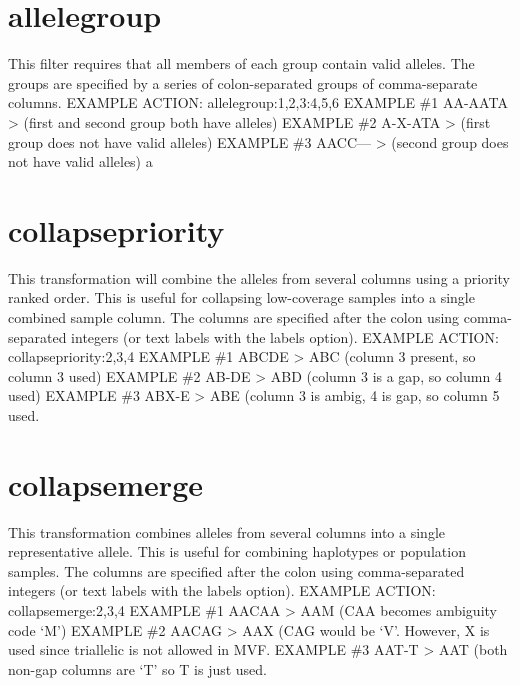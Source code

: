 \documentclass[letterpaper,11pt,english]{sphinxmanual}
\begin{document}
\section{allelegroup}
\label{\detokenize{mvf_filter_modules:allelegroup}}
This filter requires that all members of each group contain
valid alleles.  The groups are specified by a series of colon-separated
groups of comma-separate columns.
EXAMPLE ACTION: allelegroup:1,2,3:4,5,6
EXAMPLE \#1 AA-AATA \textendash{}\textgreater{}  (first and second group both have alleles)
EXAMPLE \#2 A-X-ATA \textendash{}\textgreater{}  (first group does not have valid alleles)
EXAMPLE \#3 AACC— \textendash{}\textgreater{}  (second group does not have valid alleles)
a


\section{collapsepriority}
\label{\detokenize{mvf_filter_modules:collapsepriority}}
This transformation will combine the alleles from several
columns using a priority ranked order. This is useful for collapsing
low-coverage samples into a single combined sample column.
The columns  are specified after the colon using comma-separated integers
(or text labels with the \textendash{}labels option).
EXAMPLE ACTION: collapsepriority:2,3,4
EXAMPLE \#1 ABCDE \textendash{}\textgreater{} ABC   (column 3 present, so column 3 used)
EXAMPLE \#2 AB-DE \textendash{}\textgreater{} ABD   (column 3 is a gap, so column 4 used)
EXAMPLE \#3 ABX-E \textendash{}\textgreater{} ABE   (column 3 is ambig, 4 is gap, so column 5 used.


\section{collapsemerge}
\label{\detokenize{mvf_filter_modules:collapsemerge}}
This transformation combines alleles from several columns
into a single representative allele. This is useful for
combining haplotypes or population samples. The columns
are specified after the colon using comma-separated integers
(or text labels with the \textendash{}labels option).
EXAMPLE ACTION: collapsemerge:2,3,4
EXAMPLE \#1 AACAA \textendash{}\textgreater{} AAM (CAA becomes ambiguity code ‘M’)
EXAMPLE \#2 AACAG \textendash{}\textgreater{} AAX (CAG would be ‘V’. However, X is used since triallelic is not allowed in MVF.
EXAMPLE \#3 AAT-T \textendash{}\textgreater{} AAT (both non-gap columns are ‘T’ so T is just used.
\end{document}
